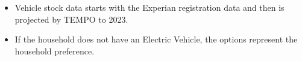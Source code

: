 \begin{itemize}
\item Vehicle stock data starts with the Experian registration data and then is projected by TEMPO to 2023.
\item If the household does not have an Electric Vehicle, the options represent the household preference.
\end{itemize}

